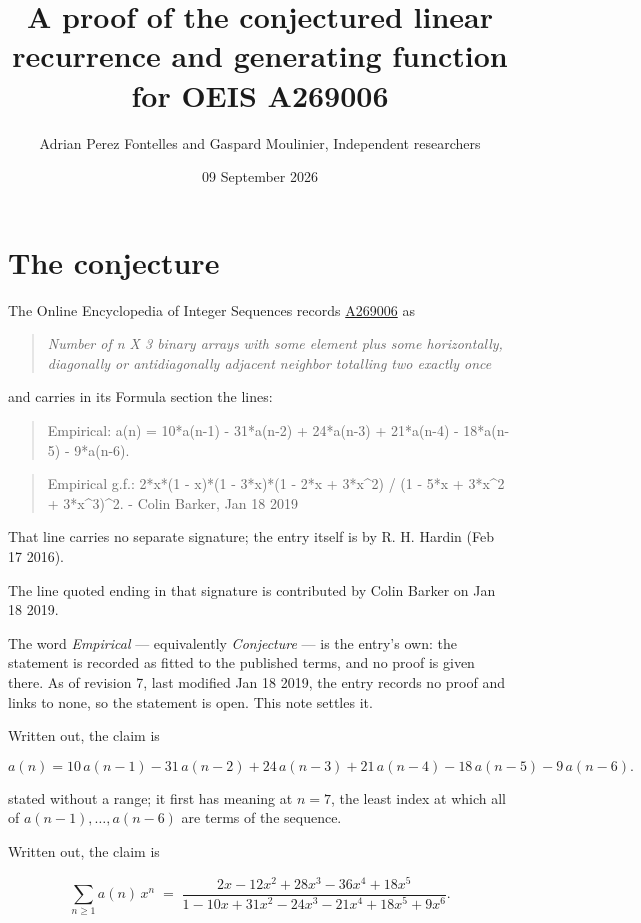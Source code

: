 \documentclass[11pt]{article}
\title{A proof of the conjectured linear recurrence and generating function for OEIS A269006}
\author{Adrian Perez Fontelles and Gaspard Moulinier, Independent researchers}
\date{09 September 2026}
\theoremstyle{definition}
\begin{document}
\maketitle
\section{The conjecture}

The Online Encyclopedia of Integer Sequences records \href{https://oeis.org/A269006}{A269006} as

\begin{quote}\itshape Number of n X 3 binary arrays with some element plus some horizontally, diagonally or antidiagonally adjacent neighbor totalling two exactly once\end{quote}

and carries in its Formula section the lines:

\begin{quote}\ttfamily Empirical: a(n) = 10*a(n-1) - 31*a(n-2) + 24*a(n-3) + 21*a(n-4) - 18*a(n-5) - 9*a(n-6).\end{quote}

\begin{quote}\ttfamily Empirical g.f.: 2*x*(1 - x)*(1 - 3*x)*(1 - 2*x + 3*x\textasciicircum{}2) /  (1 - 5*x + 3*x\textasciicircum{}2 + 3*x\textasciicircum{}3)\textasciicircum{}2. - Colin Barker, Jan 18 2019\end{quote}

That line carries no separate signature; the entry itself is by R. H. Hardin (Feb 17 2016).

The line quoted ending in that signature is contributed by Colin Barker on Jan 18 2019.

The word {\itshape Empirical} --- equivalently {\itshape Conjecture} --- is the entry's own: the statement is recorded as fitted to the published terms, and no proof is given there. As of revision 7, last modified Jan 18 2019, the entry records no proof and links to none, so the statement is open. This note settles it.

Written out, the claim is

\[a(n) = 10\,a(n-1) - 31\,a(n-2) + 24\,a(n-3) + 21\,a(n-4) - 18\,a(n-5) - 9\,a(n-6).\]

stated without a range; it first has meaning at $n = 7$, the least index at which all of $a(n-1),\dots,a(n-6)$ are terms of the sequence.

Written out, the claim is

\[\sum_{n \ge 1} a(n)\,x^n \;=\; \frac{2x - 12x^{2} + 28x^{3} - 36x^{4} + 18x^{5}}{1 - 10x + 31x^{2} - 24x^{3} - 21x^{4} + 18x^{5} + 9x^{6}}.\]
\end{document}
